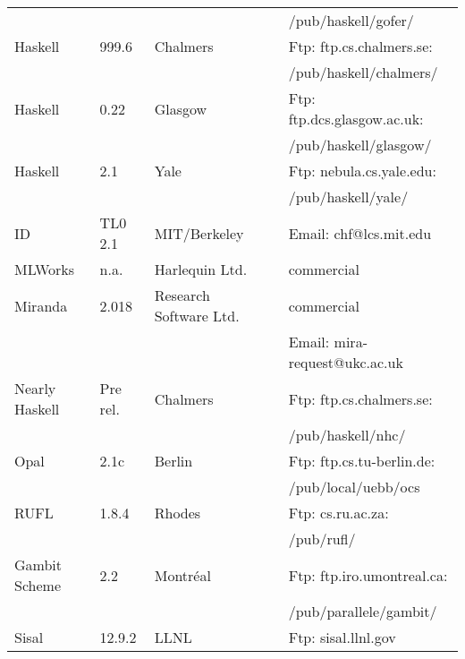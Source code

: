\begin{table}
\begin{center}
\begin{tabular}{|l|l|l|l|l|}
             &       &                      &             & {\small /pub/haskell/gofer/} \\
Haskell      & 999.6 &Chalmers              &\cite{Aug93c}& Ftp: {\small ftp.cs.chalmers.se:} \\
             &       &                      &             & {\small /pub/haskell/chalmers/} \\
Haskell      & 0.22  &Glasgow               &\cite{Pey93c}& Ftp: {\small ftp.dcs.glasgow.ac.uk:} \\
             &       &                      &             & {\small /pub/haskell/glasgow/} \\
Haskell      & 2.1   &Yale                  &\cite{Yal94} & Ftp: {\small nebula.cs.yale.edu:} \\
             &       &                      &             & {\small /pub/haskell/yale/} \\
ID           &TL0 2.1&MIT/Berkeley          &\cite{Nik90a}& Email: {\small chf@lcs.mit.edu} \\
MLWorks      & n.a.  &Harlequin Ltd.        &\cite{Har94x}& commercial \\
Miranda      & 2.018 &Research Software Ltd.&\cite{Tur90a}& commercial \\
             &       &                      &             & Email: {\small mira-request@ukc.ac.uk} \\
Nearly Haskell & Pre rel. &Chalmers         &\cite{Roj94} & Ftp: {\small ftp.cs.chalmers.se:} \\
             &       &                      &             & {\small /pub/haskell/nhc/} \\
Opal         & 2.1c  &Berlin                &\cite{Sch91} & Ftp: {\small ftp.cs.tu-berlin.de:} \\
             &       &                      &             & {\small /pub/local/uebb/ocs} \\
RUFL         & 1.8.4 &Rhodes                &\cite{Wen91} & Ftp: {\small cs.ru.ac.za:} \\
             &       &                      &             & {\small /pub/rufl/} \\
Gambit Scheme&  2.2  &Montr\'eal            &\cite{Fee90} & Ftp: {\small ftp.iro.umontreal.ca:} \\
             &       &                      &             & {\small /pub/parallele/gambit/} \\
Sisal        &12.9.2 &LLNL                  &\cite{Can92c}& Ftp: {\small sisal.llnl.gov} \\

\end{tabular}
\end{center}
\end{table}
